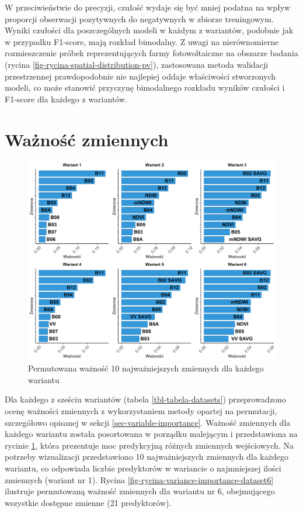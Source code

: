 \documentclass{amuthesis}
\begin{document}
W przeciwieństwie do precyzji, czułość wydaje się być mniej podatna na
wpływ proporcji obserwacji pozytywnych do negatywnych w zbiorze
treningowym. Wyniki czułości dla poszczególnych modeli w każdym z
wariantów, podobnie jak w przypadku F1-score, mają rozkład bimodalny. Z
uwagi na nierównomierne rozmieszczenie próbek reprezentujących farmy
fotowoltaiczne na obszarze badania (rycina
\ref{fig-rycina-spatial-distribution-pv}), zastosowana metoda walidacji
przestrzennej prawdopodobnie nie najlepiej oddaje właściwości
stworzonych modeli, co może stanowić przyczynę bimodalnego rozkładu
wyników czułości i F1-score dla każdego z wariantów.

\hypertarget{sec-results-variable-importance}{%
\section{Ważność zmiennych}\label{sec-results-variable-importance}}

\begin{figure}[t]

{\centering \includegraphics[width=1.05\textwidth,height=\textheight]{figures/importance_cowplot_pl.png}

}

\caption{\label{fig-rycina-variance-importance_cowplot}Permutowana
ważność 10 najważniejszych zmiennych dla każdego wariantu}

\end{figure}

Dla każdego z sześciu wariantów (tabela \ref{tbl-tabela-datasets})
przeprowadzono ocenę ważności zmiennych z wykorzystaniem metody opartej
na permutacji, szczegółowo opisanej w sekcji
\ref{sec-variable-importance}. Ważność zmiennych dla każdego wariantu
została posortowana w porządku malejącym i przedstawiona na rycinie
\ref{fig-rycina-variance-importance_cowplot}, która prezentuje moc
predykcyjną różnych zmiennych wejściowych. Na potrzeby wizualizacji
przedstawiono 10 najważniejszych zmiennych dla każdego wariantu, co
odpowiada liczbie predyktorów w wariancie o najmniejszej ilości
zmiennych (wariant nr 1). Rycina
\ref{fig-rycina-variance-importance-dataset6} ilustruje permutowaną
ważność zmiennych dla wariantu nr 6, obejmującego wszystkie dostępne
zmienne (21 predyktorów).
\end{document}
